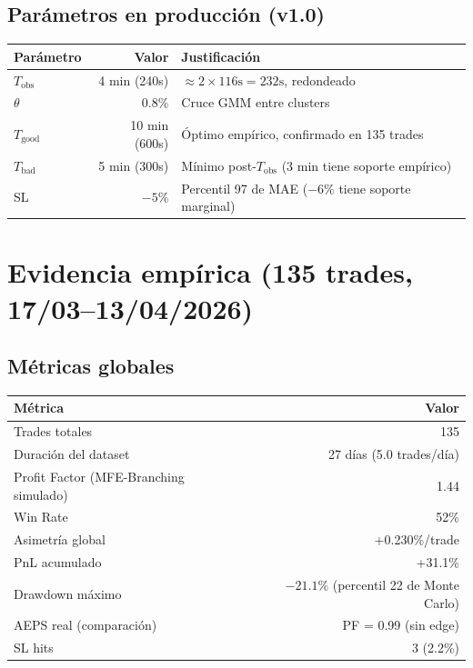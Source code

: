 \documentclass[11pt,a4paper]{article}
\begin{document}
\subsection{Parámetros en producción (v1.0)}
 
\begin{table}[H]
\centering
\begin{tabular}{lrl}
\toprule
\textbf{Parámetro} & \textbf{Valor} & \textbf{Justificación} \\
\midrule
$T_{\text{obs}}$ & 4 min (240s) & $\approx 2 \times 116\text{s} = 232\text{s}$, redondeado \\
$\theta$ & 0.8\% & Cruce GMM entre clusters \\
$T_{\text{good}}$ & 10 min (600s) & Óptimo empírico, confirmado en 135 trades \\
$T_{\text{bad}}$ & 5 min (300s) & Mínimo post-$T_{\text{obs}}$ (3 min tiene soporte empírico) \\
SL & $-5\%$ & Percentil 97 de MAE ($-6\%$ tiene soporte marginal) \\
\bottomrule
\end{tabular}
\end{table}
 
\section{Evidencia empírica (135 trades, 17/03--13/04/2026)}
 
\subsection{Métricas globales}
 
\begin{table}[H]
\centering
\begin{tabular}{lr}
\toprule
\textbf{Métrica} & \textbf{Valor} \\
\midrule
Trades totales & 135 \\
Duración del dataset & 27 días (5.0 trades/día) \\
Profit Factor (MFE-Branching simulado) & 1.44 \\
Win Rate & 52\% \\
Asimetría global & +0.230\%/trade \\
PnL acumulado & +31.1\% \\
Drawdown máximo & $-21.1\%$ (percentil 22 de Monte Carlo) \\
AEPS real (comparación) & PF = 0.99 (sin edge) \\
SL hits & 3 (2.2\%) \\
\bottomrule
\end{tabular}
\end{table}
 
\end{document}
